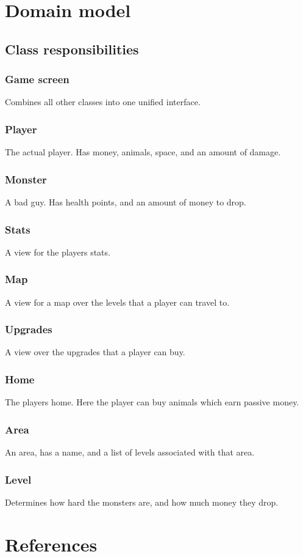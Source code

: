 \documentclass{article}
\begin{document}
\section{Domain model}

\subsection{Class responsibilities}
\subsubsection{Game screen}
Combines all other classes into one unified interface.
\subsubsection{Player}
The actual player. Has money, animals, space, and an amount of damage.
\subsubsection{Monster}
A bad guy. Has health points, and an amount of money to drop.
\subsubsection{Stats}
A view for the players stats.
\subsubsection{Map}
A view for a map over the levels that a player can travel to.
\subsubsection{Upgrades}
A view over the upgrades that a player can buy.
\subsubsection{Home}
The players home. Here the player can buy animals which earn passive money. 
\subsubsection{Area}
An area, has a name, and a list of levels associated with that area.
\subsubsection{Level}
Determines how hard the monsters are, and how much money they drop.
\section{References}
\end{document}
